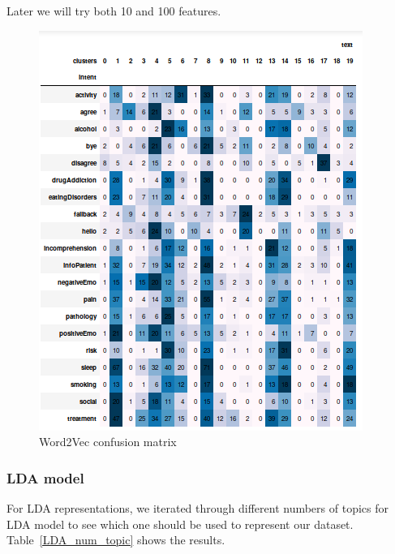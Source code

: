 \documentclass[11pt]{article}
\begin{document}

Later we will try both 10 and 100 features.

\begin{figure}[h]
	\centering
 	\includegraphics[scale=0.7]{best_w2v_cm.png}
	\caption{Word2Vec confusion matrix}
 \label{w2v_cm_mat}
 \end{figure}
\FloatBarrier

\subsubsection{LDA model}
\label{subsec:lda}

For LDA representations, we iterated through different numbers of
topics for LDA model to see which one should be used to represent our
dataset. Table~\ref{LDA_num_topic} shows the results. 
\end{document}
